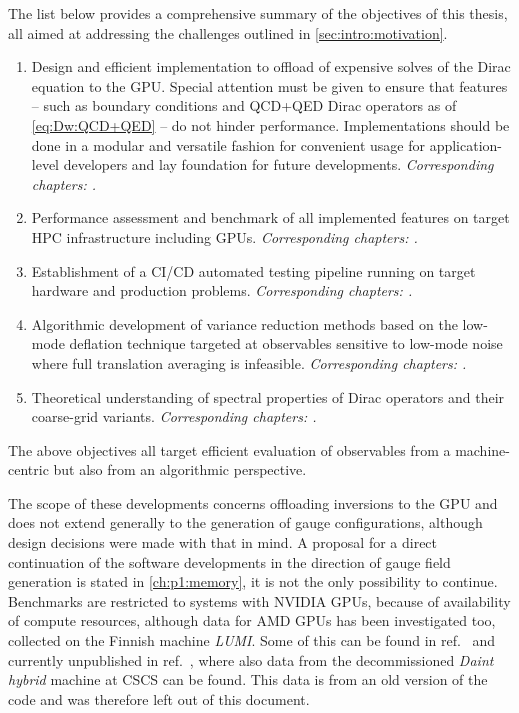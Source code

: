 The list below provides a comprehensive summary of the objectives of this thesis, all aimed at addressing the challenges outlined in \cref{sec:intro:motivation}.
\begin{enumerate}
\item{
Design and efficient implementation to offload of expensive solves of the Dirac equation to the GPU.
Special attention must be given to ensure that features -- such as \Cstar boundary conditions and QCD+QED Dirac operators as of \cref{eq:Dw:QCD+QED} -- do not hinder performance.
Implementations should be done in a modular and versatile fashion for convenient usage for application-level developers and lay foundation for future developments.
\emph{Corresponding chapters: .}
}
\item{
Performance assessment and benchmark of all implemented features on target HPC infrastructure including GPUs.
\emph{Corresponding chapters: .}
}
\item{
Establishment of a CI/CD automated testing pipeline running on target hardware and production problems.
\emph{Corresponding chapters: .}
}
\item{
Algorithmic development of variance reduction methods based on the low-mode deflation technique targeted at observables sensitive to low-mode noise where full translation averaging is infeasible.
\emph{Corresponding chapters: .}
}
\item{
Theoretical understanding of spectral properties of Dirac operators and their coarse-grid variants.
\emph{Corresponding chapters: .}
}
\end{enumerate}
The above objectives all target efficient evaluation of observables from a machine-centric but also from an algorithmic perspective.

The scope of these developments concerns offloading inversions to the GPU and does not extend generally to the generation of gauge configurations, although design decisions were made with that in mind.
A proposal for a direct continuation of the software developments in the direction of gauge field generation is stated in \cref{ch:p1:memory}, it is not the only possibility to continue.
Benchmarks are restricted to systems with NVIDIA GPUs, because of availability of compute resources, although data for AMD GPUs has been investigated too, collected on the Finnish machine \emph{LUMI}.
Some of this can be found in ref.~ and currently unpublished in ref.~, where also data from the decommissioned \emph{Daint hybrid} machine at CSCS can be found.
This data is from an old version of the code and was therefore left out of this document.

